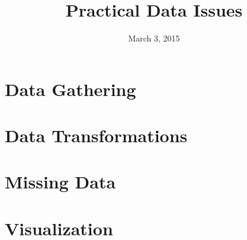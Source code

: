 
\usepackage{tikz}
\usetikzlibrary{shapes,arrows}
\usetikzlibrary{decorations.pathreplacing}
\usepackage{tikz-3dplot}

\title{Practical Data Issues}

\date[]{March 3, 2015}



\frame{\titlepage}

\frame{\tableofcontents}


\section{Data Gathering}
\frame{\tableofcontents[currentsection]}

\section{Data Transformations}
\frame{\tableofcontents[currentsection]}





\section{Missing Data}
\frame{\tableofcontents[currentsection]}






\section{Visualization}
\frame{\tableofcontents[currentsection]}


\appendix
\frame{}


